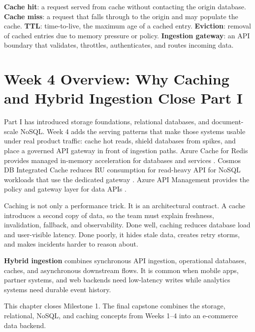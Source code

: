 \begin{keyterms}
\textbf{Cache hit}: a request served from cache without contacting the origin database.\quad
\textbf{Cache miss}: a request that falls through to the origin and may populate the cache.\quad
\textbf{TTL}: time-to-live, the maximum age of a cached entry.\quad
\textbf{Eviction}: removal of cached entries due to memory pressure or policy.\quad
\textbf{Ingestion gateway}: an API boundary that validates, throttles, authenticates, and routes incoming data.
\end{keyterms}

\section{Week 4 Overview: Why Caching and Hybrid Ingestion Close Part I}
Part I has introduced storage foundations, relational databases, and document-scale NoSQL. Week 4 adds the serving patterns that make those systems usable under real product traffic: cache hot reads, shield databases from spikes, and place a governed API gateway in front of ingestion paths. Azure Cache for Redis provides managed in-memory acceleration for databases and services \cite{microsoft2025azureCacheRedis}. Cosmos DB Integrated Cache reduces RU consumption for read-heavy API for NoSQL workloads that use the dedicated gateway \cite{microsoft2025cosmosIntegratedCache}. Azure API Management provides the policy and gateway layer for data APIs \cite{microsoft2025apimOverview}.

Caching is not only a performance trick. It is an architectural contract. A cache introduces a second copy of data, so the team must explain freshness, invalidation, fallback, and observability. Done well, caching reduces database load and user-visible latency. Done poorly, it hides stale data, creates retry storms, and makes incidents harder to reason about.

\begin{definitionbox}
\textbf{Hybrid ingestion} combines synchronous API ingestion, operational databases, caches, and asynchronous downstream flows. It is common when mobile apps, partner systems, and web backends need low-latency writes while analytics systems need durable event history.
\end{definitionbox}

\begin{notebox}
This chapter closes Milestone 1. The final capstone combines the storage, relational, NoSQL, and caching concepts from Weeks 1--4 into an e-commerce data backend.
\end{notebox}

